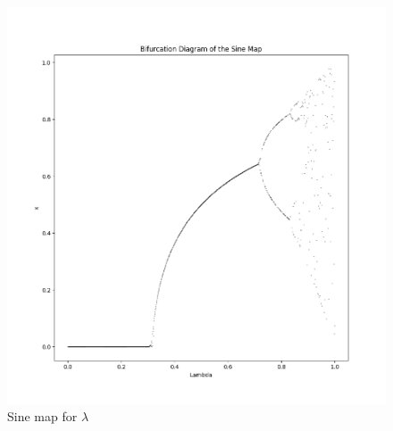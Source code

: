 \documentclass[11pt]{article}
\begin{document}
\begin{figure}[h!]
    \centering
    \includegraphics{bifurc.png}
    \caption{Sine map for $\lambda$}
    \label{fig:bifurc}
\end{figure}
\end{document}
